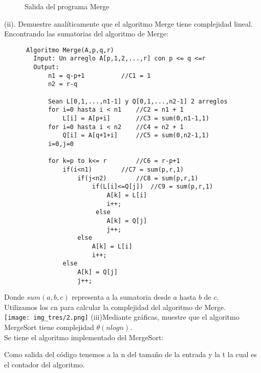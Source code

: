 \documentclass[12pt,twoside]{article}
\newcommand{\addfigure}[4]{
        \begin{figure}[htbp!]
            \begin{center}	
                \fbox{\texttt{[image: \#2]}}
                \caption{#4}
                \label{#3}
            \end{center}
        \end{figure}
  }
\begin{document}
\addfigure{0.9}{img_tres/GraficaMerge}{fig:SM}{Salida del programa Merge}


(ii). Demuestre analíticamente que el algoritmo Merge tiene complejidad lineal.
\\Encontrando las sumatorias del algoritmo de Merge: 
\begin{lstlisting}
      Algoritmo Merge(A,p,q,r)
    	Input: Un arreglo A[p,1,2,...,r] con p <= q <=r
        Output: 
            n1 = q-p+1			//C1 = 1
            n2 = r-q		
            
            Sean L[0,1,...,n1-1] y Q[0,1,...,n2-1] 2 arreglos
            for i=0 hasta i < n1  	//C2 = n1 + 1
            	L[i] = A[p+i]		//C3 = sum(0,n1-1,1)
            for i=0 hasta i < n2	//C4 = n2 + 1 
            	Q[i] = A[q+1+i]		//C5 = sum(0,n2-1,1)
            i=0,j=0
            
            for k=p to k<= r		//C6 = r-p+1
            	if(i<n1)		//C7 = sum(p,r,1)
                    if(j<n2)		//C8 = sum(p,r,1)
                    	if(L[i]<=Q[j])	//C9 = sum(p,r,1)
                            A[k] = L[i]
                            i++;
                         else
                            A[k] = Q[j]
                            j++;
                    else
                    	A[k] = L[i]
                        i++;
                else
                    A[k] = Q[j]
                    j++;
   	\end{lstlisting}
Donde $sum(a,b,c)$ representa a la sumatoria desde $a$ hasta $b$ de $c$.\\
Utilizamos los cn para calcular la complejidad del algoritmo de Merge.
\\
\texttt{[image: img\_tres/2.png]}
(iii)Mediante gráficas, muestre que el algoritmo MergeSort tiene complejidad $\theta(nlogn)$.\\
Se tiene el algoritmo implementado del MergeSort: 


Como salida del código tenemos a la n del tamaño de la entrada y la t la cual es el contador del algoritmo.
\end{document}
